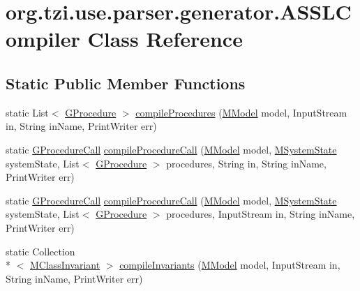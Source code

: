 \hypertarget{classorg_1_1tzi_1_1use_1_1parser_1_1generator_1_1_a_s_s_l_compiler}{\section{org.\-tzi.\-use.\-parser.\-generator.\-A\-S\-S\-L\-Compiler Class Reference}
\label{classorg_1_1tzi_1_1use_1_1parser_1_1generator_1_1_a_s_s_l_compiler}
}
\subsection*{Static Public Member Functions}
\begin{DoxyCompactItemize}
\item 
static List$<$ \hyperlink{classorg_1_1tzi_1_1use_1_1gen_1_1assl_1_1statics_1_1_g_procedure}{G\-Procedure} $>$ \hyperlink{classorg_1_1tzi_1_1use_1_1parser_1_1generator_1_1_a_s_s_l_compiler_a89c13a00d313b119c3d2940b6bf6a9c9}{compile\-Procedures} (\hyperlink{classorg_1_1tzi_1_1use_1_1uml_1_1mm_1_1_m_model}{M\-Model} model, Input\-Stream in, String in\-Name, Print\-Writer err)
\item 
static \hyperlink{classorg_1_1tzi_1_1use_1_1gen_1_1tool_1_1_g_procedure_call}{G\-Procedure\-Call} \hyperlink{classorg_1_1tzi_1_1use_1_1parser_1_1generator_1_1_a_s_s_l_compiler_a873d49883cd5804a3327cd5e43f39fbf}{compile\-Procedure\-Call} (\hyperlink{classorg_1_1tzi_1_1use_1_1uml_1_1mm_1_1_m_model}{M\-Model} model, \hyperlink{classorg_1_1tzi_1_1use_1_1uml_1_1sys_1_1_m_system_state}{M\-System\-State} system\-State, List$<$ \hyperlink{classorg_1_1tzi_1_1use_1_1gen_1_1assl_1_1statics_1_1_g_procedure}{G\-Procedure} $>$ procedures, String in, String in\-Name, Print\-Writer err)
\item 
static \hyperlink{classorg_1_1tzi_1_1use_1_1gen_1_1tool_1_1_g_procedure_call}{G\-Procedure\-Call} \hyperlink{classorg_1_1tzi_1_1use_1_1parser_1_1generator_1_1_a_s_s_l_compiler_a6b7197f99a0e019c0e31f5759541fe0a}{compile\-Procedure\-Call} (\hyperlink{classorg_1_1tzi_1_1use_1_1uml_1_1mm_1_1_m_model}{M\-Model} model, \hyperlink{classorg_1_1tzi_1_1use_1_1uml_1_1sys_1_1_m_system_state}{M\-System\-State} system\-State, List$<$ \hyperlink{classorg_1_1tzi_1_1use_1_1gen_1_1assl_1_1statics_1_1_g_procedure}{G\-Procedure} $>$ procedures, Input\-Stream in, String in\-Name, Print\-Writer err)
\item 
static Collection\\*
$<$ \hyperlink{classorg_1_1tzi_1_1use_1_1uml_1_1mm_1_1_m_class_invariant}{M\-Class\-Invariant} $>$ \hyperlink{classorg_1_1tzi_1_1use_1_1parser_1_1generator_1_1_a_s_s_l_compiler_a0ead6f09a6284c7d58d5e70a01015d55}{compile\-Invariants} (\hyperlink{classorg_1_1tzi_1_1use_1_1uml_1_1mm_1_1_m_model}{M\-Model} model, Input\-Stream in, String in\-Name, Print\-Writer err)
\end{DoxyCompactItemize}


